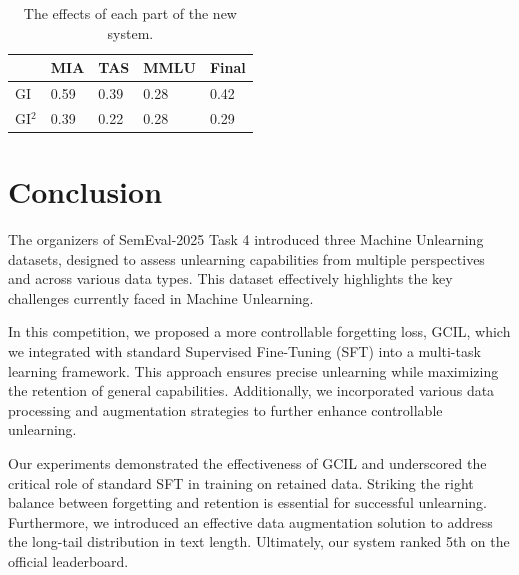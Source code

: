 \documentclass[11pt]{article}
\begin{document}
\begin{table}[h]\footnotesize
  \centering
    \begin{tabular}{l|l|l|l|l}
    \hline
        ~ & MIA & TAS & MMLU & Final \\ \hline
        GI & 0.59 & 0.39 & 0.28 & 0.42 \\ \hline
        GI$^2$ & 0.39 & 0.22 & 0.28 & 0.29 \\ \hline
    \end{tabular}
  \caption{The effects of each part of the new system.}
  \label{tab:accents}
\end{table}





\section{Conclusion} 
The organizers of SemEval-2025 Task 4 introduced three Machine Unlearning datasets, designed to assess unlearning capabilities from multiple perspectives and across various data types. This dataset effectively highlights the key challenges currently faced in Machine Unlearning.


In this competition, we proposed a more controllable forgetting loss, GCIL, which we integrated with standard Supervised Fine-Tuning (SFT) into a multi-task learning framework. This approach ensures precise unlearning while maximizing the retention of general capabilities. Additionally, we incorporated various data processing and augmentation strategies to further enhance controllable unlearning.

Our experiments demonstrated the effectiveness of GCIL and underscored the critical role of standard SFT in training on retained data. Striking the right balance between forgetting and retention is essential for successful unlearning. Furthermore, we introduced an effective data augmentation solution to address the long-tail distribution in text length. Ultimately, our system ranked 5th on the official leaderboard.
\end{document}
